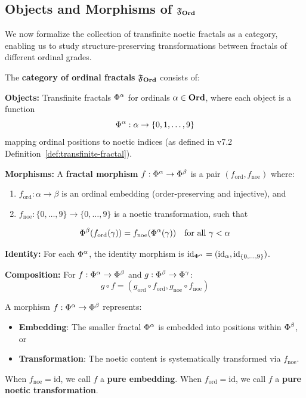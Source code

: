 \subsection{Objects and Morphisms of $\mathfrak{F}_{\mathbf{Ord}}$}

We now formalize the collection of transfinite noetic fractals as a category, enabling us to study structure-preserving transformations between fractals of different ordinal grades.

\begin{definition}
\label{def:ordfrac-category}
The \textbf{category of ordinal fractals} $\mathfrak{F}_{\mathbf{Ord}}$ consists of:

\textbf{Objects:} Transfinite fractals $\Phi^{\alpha}$ for ordinals $\alpha \in \mathbf{Ord}$, where each object is a function
\[
\Phi^{\alpha} : \alpha \to \{0, 1, \ldots, 9\}
\]
mapping ordinal positions to noetic indices (as defined in v7.2 Definition~\ref*{def:transfinite-fractal}).

\textbf{Morphisms:} A \textbf{fractal morphism} $f : \Phi^{\alpha} \to \Phi^{\beta}$ is a pair $(f_\mathrm{ord}, f_\mathrm{noe})$ where:
\begin{enumerate}[label=(\roman*)]
  \item $f_\mathrm{ord} : \alpha \to \beta$ is an ordinal embedding (order-preserving and injective), and
  \item $f_\mathrm{noe} : \{0, \ldots, 9\} \to \{0, \ldots, 9\}$ is a noetic transformation, such that
\end{enumerate}
\[
\Phi^{\beta}(f_\mathrm{ord}(\gamma)) = f_\mathrm{noe}(\Phi^{\alpha}(\gamma)) \quad \text{for all } \gamma < \alpha
\]

\textbf{Identity:} For each $\Phi^{\alpha}$, the identity morphism is $\mathrm{id}_{\Phi^{\alpha}} = (\mathrm{id}_\alpha, \mathrm{id}_{\{0,\ldots,9\}})$.

\textbf{Composition:} For $f : \Phi^{\alpha} \to \Phi^{\beta}$ and $g : \Phi^{\beta} \to \Phi^{\gamma}$:
\[
g \circ f = (g_\mathrm{ord} \circ f_\mathrm{ord}, g_\mathrm{noe} \circ f_\mathrm{noe})
\]
\end{definition}

\begin{remark}
\label{rem:morphism-intuition}
A morphism $f : \Phi^{\alpha} \to \Phi^{\beta}$ represents:
\begin{itemize}
  \item \textbf{Embedding}: The smaller fractal $\Phi^{\alpha}$ is embedded into positions within $\Phi^{\beta}$, or
  \item \textbf{Transformation}: The noetic content is systematically transformed via $f_\mathrm{noe}$.
\end{itemize}
When $f_\mathrm{noe} = \mathrm{id}$, we call $f$ a \textbf{pure embedding}. When $f_\mathrm{ord} = \mathrm{id}$, we call $f$ a \textbf{pure noetic transformation}.
\end{remark}

